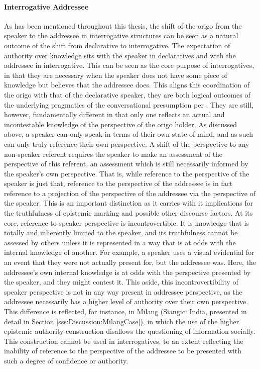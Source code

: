 \paragraph{Interrogative Addressee}
As has been mentioned throughout this thesis, the shift of the origo from the speaker to the addressee in interrogative structures can be seen as a natural outcome of the shift from declarative to interrogative. The expectation of authority over knowledge sits with the speaker in declaratives and with the addressee in interrogative. This can be seen as the core purpose of interrogatives, in that they are necessary when the speaker does not have some piece of knowledge but believes that the addressee does. This aligns this coordination of the origo with that of the declarative speaker, they are both logical outcomes of the underlying pragmatics of the conversational presumption per . They are still, however, fundamentally different in that only one reflects an actual and incontestable knowledge of the perspective of the origo holder. As discussed above, a speaker can only speak in terms of their own state-of-mind, and as such can only truly reference their own perspective. A shift of the perspective to any non-speaker referent requires the speaker to make an assessment of the perspective of this referent, an assessment which is still necessarily informed by the speaker's own perspective. That is, while reference to the perspective of the speaker is just that, reference to the perspective of the addressee is in fact reference to a projection of the perspective of the addressee via the perspective of the speaker. This is an important distinction as it carries with it implications for the truthfulness of epistemic marking and possible other discourse factors. At its core, reference to speaker perspective is incontrovertible. It is knowledge that is totally and inherently limited to the speaker, and its truthfulness cannot be assessed by others unless it is represented in a way that is at odds with the internal knowledge of another. For example, a speaker uses a visual evidential for an event that they were not actually present for, but the addressee was. Here, the addressee's own internal knowledge is at odds with the perspective presented by the speaker, and they might contest it. This aside, this incontrovertibility of speaker perspective is not in any way present in addressee perspective, as the addressee necessarily has a higher level of authority over their own perspective. This difference is reflected, for instance, in Milang (Siangic: India, presented in detail in Section \ref{sss:Discussion:MilangCase}), in which the use of the higher epistemic authority construction disallows the questioning of information socially. This construction cannot be used in interrogatives, to an extent reflecting the inability of reference to the perspective of the addressee to be presented with such a degree of confidence or authority.
